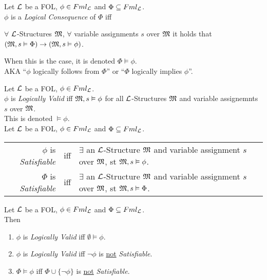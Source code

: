 \documentclass[11pt,a4paper]{article}
\begin{document}
Let $\mathcal{L}$ be a FOL, $\phi\in Fml_{\mathcal{L}}$ and $\Phi\subseteq Fml_{\mathcal{L}}$.\\
$\phi$ is a \textit{Logical Consequence} of $\Phi$ iff
\begin{center}
$\forall$ $\mathcal{L}$-Structures $\mathfrak{M}$, $\forall$ variable assignments $s$ over $\mathfrak{M}$ it holds that $(\mathfrak{M},s\vDash\Phi)\to(\mathfrak{M},s\vDash\phi)$.
\end{center}
\nb When this is the case, it is denoted $\Phi\vDash\phi$.\\
\nb AKA ``$\phi$ logically follows from $\Phi$'' or ``$\Phi$ logically implies $\phi$''.\\



Let $\mathcal{L}$ be a FOL, $\phi\in Fml_{\mathcal{L}}$.\\
$\phi$ is \textit{Logically Valid} iff $\mathfrak{M},s\vDash\phi$ for all $\mathcal{L}$-Structures $\mathfrak{M}$ and variable assignemnts $s$ over $\mathfrak{M}$.\\
\nb This is denoted $\vDash\phi$.\\

Let $\mathcal{L}$ be a FOL, $\phi\in Fml_{\mathcal{L}}$ and $\Phi\subseteq Fml_{\mathcal{L}}$.
\begin{center}\begin{tabular}{rcl}
$\phi$ is \textit{Satisfiable}&iff&$\exists$ an $\mathcal{L}$-Structure $\mathfrak{M}$ and variable assignment $s$ over $\mathfrak{M}$, st $\mathfrak{M},s\vDash\phi$.\\
$\Phi$ is \textit{Satisfiable}&iff&$\exists$ an $\mathcal{L}$-Structure $\mathfrak{M}$ and variable assignment $s$ over $\mathfrak{M}$, st $\mathfrak{M},s\vDash\Phi$.
\end{tabular}\end{center}

\theorem{}
Let $\mathcal{L}$ be a FOL, $\phi\in Fml_{\mathcal{L}}$ and $\Phi\subseteq Fml_{\mathcal{L}}$.\\
Then
\begin{enumerate}
	\item $\phi$ is \textit{Logically Valid} iff $\emptyset\vDash\phi$.
	\item $\phi$ is \textit{Logically Valid} iff $\neg\phi$ is \underline{not} \textit{Satisfiable}.
	\item $\Phi\vDash\phi$ iff $\Phi\cup\{\neg\phi\}$ is \underline{not} \textit{Satisfiable}.
\end{enumerate}
\end{document}
